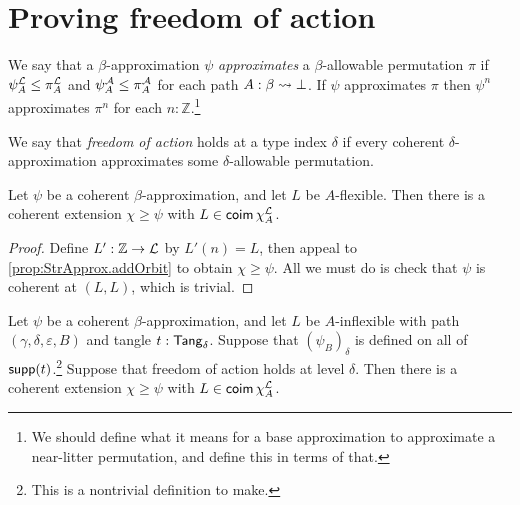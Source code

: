 \section{Proving freedom of action}
\begin{definition}[approximates]
  \label{def:Approximates}
  We say that a \( \beta \)-approximation \( \psi \) \emph{approximates} a \( \beta \)-allowable permutation \( \pi \) if \( \psi_A^{\mathcal L} \leq \pi_A^{\mathcal L} \) and \( \psi_A^{\mathcal A} \leq \pi_A^{\mathcal A} \) for each path \( A : \beta \rightsquigarrow \bot \).
  If \( \psi \) approximates \( \pi \) then \( \psi^n \) approximates \( \pi^n \) for each \( n : \mathbb Z \).\footnote{We should define what it means for a base approximation to approximate a near-litter permutation, and define this in terms of that.}
\end{definition}
\begin{definition}
  \label{def:FreedomOfAction}
  We say that \emph{freedom of action} holds at a type index \( \delta \) if every coherent \( \delta \)-approximation approximates some \( \delta \)-allowable permutation.
\end{definition}
\begin{proposition}
  \label{prop:StrApprox.addFlexible}
  Let \( \psi \) be a coherent \( \beta \)-approximation, and let \( L \) be \( A \)-flexible.
  Then there is a coherent extension \( \chi \geq \psi \) with \( L \in \operatorname{\mathsf{coim}} \chi_A^{\mathcal L} \).
\end{proposition}
\begin{proof}
  Define \( L' : \mathbb Z \to {\mathcal L} \) by \( L'(n) = L \), then appeal to \cref{prop:StrApprox.addOrbit} to obtain \( \chi \geq \psi \).
  All we must do is check that \( \psi \) is coherent at \( (L, L) \), which is trivial.
\end{proof}
\begin{proposition}
  \label{prop:StrApprox.addInflexible}
  Let \( \psi \) be a coherent \( \beta \)-approximation, and let \( L \) be \( A \)-inflexible with path \( (\gamma, \delta, \varepsilon, B) \) and tangle \( t : \mathsf{Tang}_\delta \).
  Suppose that \( (\psi_B)_\delta \) is defined on all of \( \operatorname{\mathsf{supp}}(t) \).\footnote{This is a nontrivial definition to make.}
  Suppose that freedom of action holds at level \( \delta \).
  Then there is a coherent extension \( \chi \geq \psi \) with \( L \in \operatorname{\mathsf{coim}} \chi_A^{\mathcal L} \).
\end{proposition}
